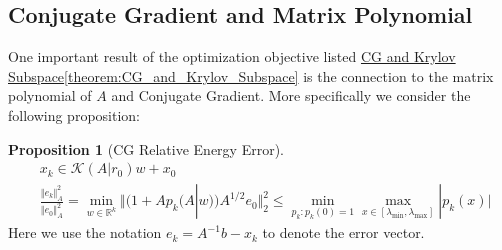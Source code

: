\documentclass[]{article}
\theoremstyle{definition}
\newtheorem{prop}{Proposition}[section]  %
\begin{document}
    \subsection{Conjugate Gradient and Matrix Polynomial}
        One important result of the optimization objective listed \hyperref[theorem:CG_and_Krylov_Subspace]{CG and Krylov Subspace\ref*{theorem:CG_and_Krylov_Subspace}} is the connection to the matrix polynomial of $A$ and Conjugate Gradient. More specifically we consider the following proposition: 
        \begin{prop}[CG Relative Energy Error]\label{prop:CG_Relative_Energy Error}
            \begin{align}
                & x_k \in \mathcal{K}(A|r_0)w + x_0
                \\
                & \frac{\Vert e_k\Vert_A^2}{\Vert e_0\Vert_A^2}
                = 
                \min_{w\in \mathbb R^k} 
                \Vert
                    (1 + Ap_k(A|w))A^{1/2}e_0
                \Vert_2^2
                \le
                \min_{p_{k}: p_{k}(0) = 1}\max_{x\in [\lambda_{\text{min}}, \lambda_{\text{max}}
                ]} |p_k(x)|
            \end{align}
            Here we use the notation $e_k = A^{-1}b - x_k$ to denote the error vector. 
        \end{prop}
\end{document}
